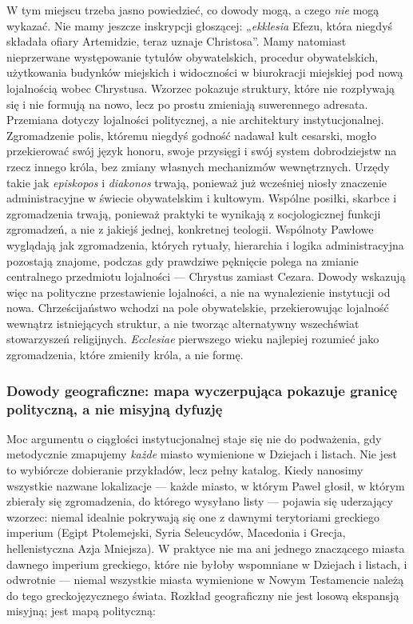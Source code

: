 W tym miejscu trzeba jasno powiedzieć, co dowody mogą, a czego \emph{nie} mogą wykazać.
Nie mamy jeszcze inskrypcji głoszącej: „\textit{ekklesia} Efezu, która niegdyś składała ofiary Artemidzie, teraz uznaje Christosa”.
Mamy natomiast nieprzerwane występowanie tytułów obywatelskich, procedur obywatelskich, użytkowania budynków miejskich i widoczności w biurokracji miejskiej pod nową lojalnością wobec Chrystusa.
Wzorzec pokazuje struktury, które nie rozpływają się i nie formują na nowo, lecz po prostu zmieniają suwerennego adresata.
Przemiana dotyczy lojalności politycznej, a nie architektury instytucjonalnej.
Zgromadzenie polis, któremu niegdyś godność nadawał kult cesarski, mogło przekierować swój język honoru, swoje przysięgi i swój system dobrodziejstw na rzecz innego króla, bez zmiany własnych mechanizmów wewnętrznych.
Urzędy takie jak \textit{episkopos} i \textit{diakonos} trwają, ponieważ już wcześniej niosły znaczenie administracyjne w świecie obywatelskim i kultowym.
Wspólne posiłki, skarbce i zgromadzenia trwają, ponieważ praktyki te wynikają z socjologicznej funkcji zgromadzeń, a nie z jakiejś jednej, konkretnej teologii.
Wspólnoty Pawłowe wyglądają jak zgromadzenia, których rytuały, hierarchia i logika administracyjna pozostają znajome, podczas gdy prawdziwe pęknięcie polega na zmianie centralnego przedmiotu lojalności — Chrystus zamiast Cezara.
Dowody wskazują więc na polityczne przestawienie lojalności, a nie na wynalezienie instytucji od nowa.
Chrześcijaństwo wchodzi na pole obywatelskie, przekierowując lojalność wewnątrz istniejących struktur, a nie tworząc alternatywny wszechświat stowarzyszeń religijnych.
\textit{Ecclesiae} pierwszego wieku najlepiej rozumieć jako zgromadzenia, które zmieniły króla, a nie formę.

\subsubsection{Dowody geograficzne: mapa wyczerpująca pokazuje granicę polityczną, a nie misyjną dyfuzję}\label{subsubsec:geographic-evidence-exhaustive-mapping-reveals-a-political-boundary-not-missionary-diffusion}

Moc argumentu o ciągłości instytucjonalnej staje się nie do podważenia, gdy metodycznie zmapujemy \emph{każde} miasto wymienione w Dziejach i listach.
Nie jest to wybiórcze dobieranie przykładów, lecz pełny katalog.
Kiedy nanosimy wszystkie nazwane lokalizacje — każde miasto, w którym Paweł głosił, w którym zbierały się zgromadzenia, do którego wysyłano listy — pojawia się uderzający wzorzec: niemal idealnie pokrywają się one z dawnymi terytoriami greckiego imperium (Egipt Ptolemejski, Syria Seleucydów, Macedonia i Grecja, hellenistyczna Azja Mniejsza).
W praktyce nie ma ani jednego znaczącego miasta dawnego imperium greckiego, które nie byłoby wspomniane w Dziejach i listach, i odwrotnie — niemal wszystkie miasta wymienione w Nowym Testamencie należą do tego greckojęzycznego świata.
Rozkład geograficzny nie jest losową ekspansją misyjną; jest mapą polityczną:

